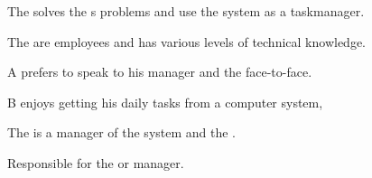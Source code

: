 \begin{figure}[h]

\begin{sadlistar}{\Astaff}

 The \astaff{} solves the \aclient[]s problems and use the system as a taskmanager.  

 The \astaff[] are employees and has various levels of technical knowledge.

 \astaff[c] A prefers to speak to his manager and the \aclient[] face-to-face.

\astaff[c] B enjoys getting his daily tasks from a computer system, 
 \end{sadlistar}
 \caption{}
 \label{fig:actorstaff}
 \end{figure}


\begin{figure}[h]

\begin{sadlistar}{\Admin[]}

 The \Admin[] is a manager of the system and the \astaff[].

 Responsible for the \hdesk[] or \astaff[] manager. 

 

 \end{sadlistar}
 \caption{}
 \label{fig:actoradmin}
 \end{figure}